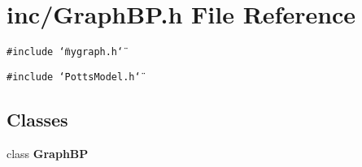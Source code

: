 \section{inc/GraphBP.h File Reference}
\label{GraphBP_8h}
{\tt \#include \char`\"{}mygraph.h\char`\"{}}\par
{\tt \#include \char`\"{}PottsModel.h\char`\"{}}\par
\subsection*{Classes}
\begin{CompactItemize}
\item 
class {\bf GraphBP}
\end{CompactItemize}
